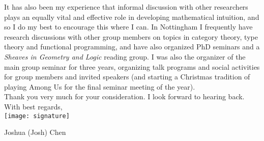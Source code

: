 \documentclass[12pt,a4paper]{article}
\begin{document}
It has also been my experience that informal discussion with other researchers plays an equally vital and effective role in developing mathematical intuition, and so I do my best to encourage this where I can.
In Nottingham I frequently have research discussions with other group members on topics in category theory, type theory and functional programming, and have also organized PhD seminars and a \textit{Sheaves in Geometry and Logic} reading group.
I was also the organizer of the main group seminar for three years, organizing talk programs and social activities for group members and invited speakers (and starting a Christmas tradition of playing Among Us for the final seminar meeting of the year). \\[3ex]
%
%
\noindent Thank you very much for your consideration.
I look forward to hearing back.\\

\noindent With best regards,\\
\hspace{-4ex}\texttt{[image: signature]}

\hspace{-2.5ex}Joshua (Josh) Chen
\end{document}
